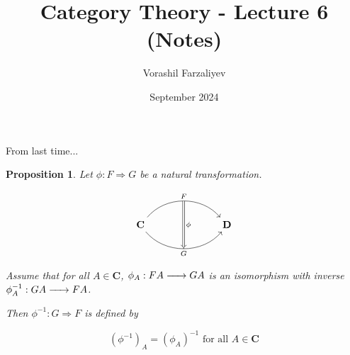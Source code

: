 \documentclass{article}
\title{Category Theory - Lecture 6 (Notes)}
\author{Vorashil Farzaliyev}
\date{September 2024}
\newtheorem{proposition}{Proposition}[section]
\renewcommand{\to}{\xrightarrow{\hspace{0.5cm}}}  %
\begin{document}
    \maketitle

    From last time...


    \begin{proposition}
        Let \(\phi: F \Rightarrow G\) be a natural transformation.

        \[
            \begin{tikzcd}[column sep=7em, row sep=4em]
                \mathbf{C} \arrow[r, bend left=50, "F"{name=F, above}]
                \arrow[r, bend right=50, "G"{name=G, below}]
                & \mathbf{D}
                \arrow[Rightarrow, from=F, to=G, "\phi"]
            \end{tikzcd}
        \]

        Assume that for all \(A \in \mathbf{C}\), \(\phi_A: FA \to GA\) is an isomorphism with
        inverse \(\phi^{-1}_A: GA \to FA\).

        Then \(\phi^{-1}: G \Rightarrow F\) is defined by

        \[
            (\phi^{-1})_A = (\phi_A)^{-1} \text{ for all } A \in \mathbf{C}
        \]
    \end{proposition}
\end{document}
